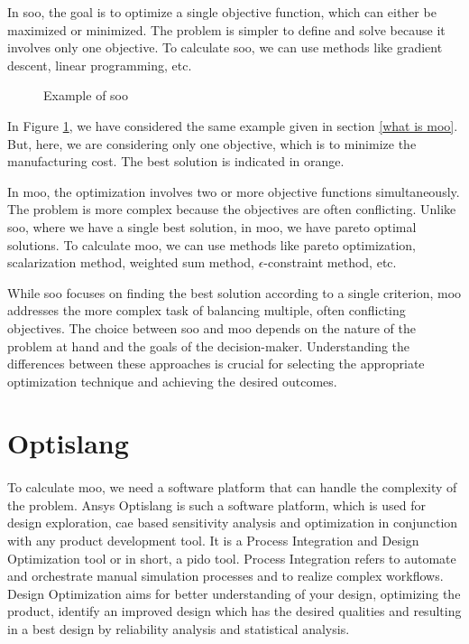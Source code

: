 In \acrfull{soo}, the goal is to optimize a single objective function, which can either be maximized or minimized. The  problem is simpler to define and solve
because it involves only one objective. To calculate \acrshort{soo}, we can use methods like gradient descent, linear programming, etc.

\begin{figure}[!h]
    \centering
    
    \caption{Example of \acrshort{soo}}
    \label{soo}
\end{figure}

In Figure \ref{soo}, we have considered the same example given in section \ref{what is moo}. But, here, we are considering only one objective, which is to
minimize the manufacturing cost. The best solution is indicated in orange.
\vspace{15pt}

In \acrshort{moo}, the optimization involves two or more objective functions simultaneously. The problem is more complex because the objectives are often
conflicting. Unlike \acrshort{soo}, where we have a single best solution, in \acrshort{moo}, we have pareto optimal solutions.
To calculate \acrshort{moo}, we can use methods like pareto optimization, scalarization method, weighted sum method, $\epsilon$-constraint method, etc.


While \acrshort{soo} focuses on finding the best solution according to a single criterion, \acrshort{moo} addresses the more complex task of balancing multiple, 
often conflicting objectives. The choice between \acrshort{soo} and \acrshort{moo} depends on the nature of the problem at hand and the goals of the decision-maker. 
Understanding the differences between these approaches is crucial for selecting the appropriate optimization technique and achieving the desired outcomes.


\section{Optislang}
\paragraph{}

To calculate \acrshort{moo}, we need a software platform that can handle the complexity of the problem. Ansys Optislang \cite{optislang} is such a software 
platform, which is used for design exploration, \acrshort{cae} based sensitivity analysis and optimization in conjunction with any product development tool. 
It is a Process Integration and Design Optimization tool or in short, a \acrshort{pido} tool. Process Integration refers to automate and orchestrate manual 
simulation processes and to realize complex workflows. Design Optimization aims for better understanding of your design, optimizing the product, identify an 
improved design which has the desired qualities and resulting in a best design by reliability analysis and statistical analysis.  


